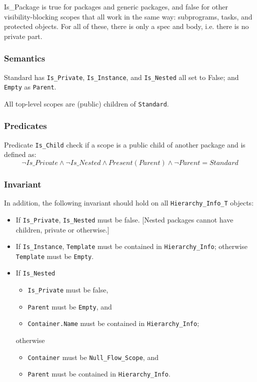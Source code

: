 \documentclass{article}
\begin{document}
Is\_Package is true for packages and generic packages, and false for other
visibility-blocking scopes that all work in the same way: subprograms,
tasks, and protected objects. For all of these, there is only a spec and
body, i.e. there is no private part.

\subsubsection{Semantics}
Standard has \verb|Is_Private|, \verb|Is_Instance|, and \verb|Is_Nested|
all set to False; and \verb|Empty| as \verb|Parent|.

All top-level scopes are (public) children of \verb|Standard|.

\subsubsection{Predicates}
Predicate \verb|Is_Child| check if a scope is a public child of another
package and is defined as:
\begin{equation*}
  \lnot Is\_Private \land
  \lnot Is\_Nested \land
  Present (Parent) \land
  \lnot Parent = Standard
\end{equation*}

\subsubsection{Invariant}
In addition, the following invariant should hold on all
\verb|Hierarchy_Info_T| objects:

\begin{itemize}
\item If \verb|Is_Private|, \verb|Is_Nested| must be false. [Nested
  packages cannot have children, private or otherwise.]

\item If \verb|Is_Instance|, \verb|Template| must be contained in
  \verb|Hierarchy_Info|; otherwise \verb|Template| must be
  \verb|Empty|.

\item If \verb|Is_Nested|
  \begin{itemize}
  \item \verb|Is_Private| must be false,
  \item \verb|Parent| must be \verb|Empty|, and
  \item \verb|Container.Name| must be contained in \verb|Hierarchy_Info|;
  \end{itemize}
  otherwise
  \begin{itemize}
  \item \verb|Container| must be \verb|Null_Flow_Scope|, and
  \item \verb|Parent| must be contained in \verb|Hierarchy_Info|.
  \end{itemize}
\end{itemize}
\end{document}
